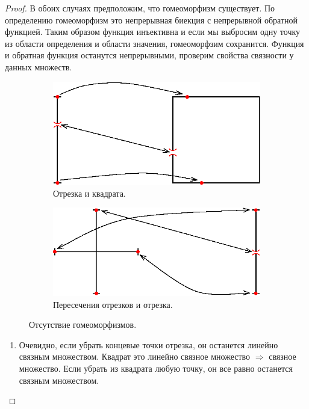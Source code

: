 \documentclass[12pt]{article}
\theoremstyle{definition}
\begin{document}
\begin{proof}
	В обоих случаях предположим, что гомеоморфизм существует. По определению гомеоморфизм это непрерывная биекция с непрерывной обратной функцией. Таким образом функция инъективна и если мы выбросим одну точку из области определения и области значения, гомеоморфзим сохранится. Функция и обратная функция останутся непрерывными, проверим свойства связности у данных множеств.
	\begin{figure}[H]
		\centering
		\begin{subfigure}[c]{0.5\textwidth}
			\centering
			\includegraphics{11_6.eps}
			\caption{Отрезка и квадрата.}
			\label{fig:11_6}
		\end{subfigure}
		\begin{subfigure}[c]{0.49\textwidth}
			\centering
			\includegraphics{11_7.eps}
			\caption{Пересечения отрезков и отрезка.}
			\label{fig:11_7}
		\end{subfigure}
		\caption{Отсутствие гомеоморфизмов.}	
		\label{fig:Гомеоморфизм}
	\end{figure}
	\begin{enumerate}[label ={\arabic*)}]
		\item Очевидно, если убрать концевые точки отрезка, он останется линейно связным множеством. Квадрат это линейно связное множество $\Rightarrow$ связное множество. Если убрать из квадрата любую точку, он все равно останется связным множеством. 
		

\end{enumerate}
\end{proof}
\end{document}
